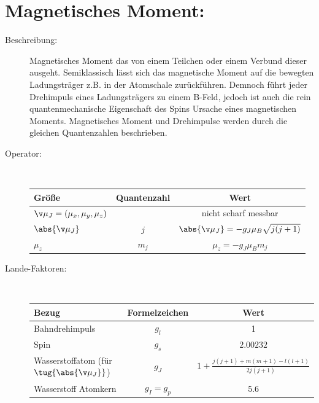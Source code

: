 \documentclass[twocolumn]{summery_4.1}
\begin{document}
\section{Magnetisches Moment:}
\begin{description}
    \item[Beschreibung:] Magnetisches Moment das von einem Teilchen oder einem Verbund dieser ausgeht. Semiklassisch lässt sich das magnetische Moment auf die bewegten Ladungsträger z.B. in der Atomschale zurückführen. Demnoch führt jeder Drehimpuls eines Ladungsträgers zu einem B-Feld, jedoch ist auch die rein quantenmechanische Eigenschaft des Spins Ursache eines magnetischen Moments. Magnetisches Moment und Drehimpulse werden durch die gleichen Quantenzahlen beschrieben.
    
    \item[Operator:]\,\vspace{-1ex}
    
    \begin{center}
        \begin{tabular}{@{}lcc@{}}
            \toprule 
            {\bf Größe} & {\bf Quantenzahl} & {\bf Wert}\\\midrule
            \(\v \mu_J = (\mu_x,\mu_y,\mu_z)\) & & nicht scharf messbar\\
            \(\abs{\v \mu_J}\) & \(j\) & \(\abs{\v \mu_J} = -g_J \mu_B \sqrt{j(j+1)}\)\\
            \(\mu_z\) & \(m_j\)  & \(\mu_z = - g_J \mu_B m_j\)\\\bottomrule
        \end{tabular}
    \end{center}\vspace{1ex}

    \item[Lande-Faktoren:]\,\vspace{-1ex}
    \begin{center}
        \begin{tabular}{@{}lcc@{}}
            \toprule
            {\bf Bezug} & {\bf Formelzeichen} & {\bf Wert}\\\midrule
            Bahndrehimpuls & \(g_l\) & 1\\
            Spin & \(g_s\) & \(2.00232\)\\
            Wasserstoffatom (für \(\tug{\abs{\v \mu_J}}\))& \(g_J\) & \(1 + \frac{j(j+1) + m(m+1) - l(l+1)}{2 j(j+1)} \)\\
            Wasserstoff Atomkern & \(g_I=g_p\) & 5.6\\\bottomrule
        \end{tabular}
    \end{center}
\end{description}
\end{document}
